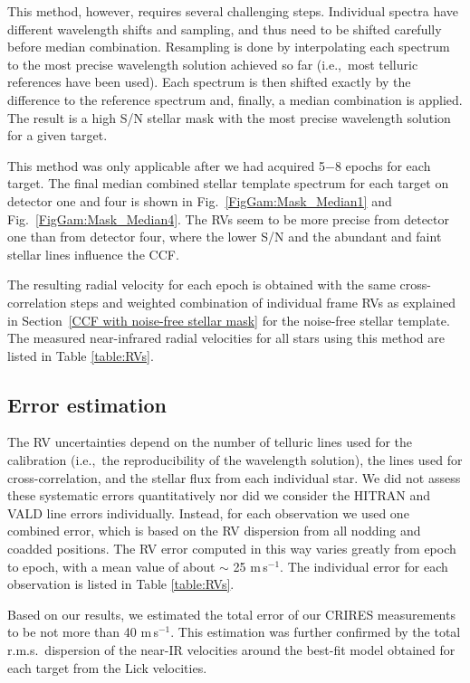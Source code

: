 \documentclass{aa}
\begin{document}
This method, however, requires several challenging steps. 
Individual spectra have different wavelength shifts and sampling, and thus need to be shifted carefully
before median combination.
Resampling is done by interpolating each spectrum to the most precise wavelength solution
achieved so far (i.e.,\ most telluric references have been used). 
Each spectrum is then shifted exactly by the difference to the reference spectrum and, finally, a median combination is applied.
The result is a high S/N stellar mask with the most precise wavelength solution for a given target.

This method was only applicable after we had acquired 5$-$8 epochs for each target. 
The final median combined stellar template spectrum for each target 
on detector one and four is shown in Fig.~\ref{FigGam:Mask_Median1} and Fig.~\ref{FigGam:Mask_Median4}.
The RVs seem to be more precise from detector one than from detector four,
where the lower S/N and the abundant and faint stellar lines influence the CCF.


The resulting radial velocity for each epoch is obtained with the same cross-correlation steps and weighted
combination of individual frame RVs as explained in Section~\ref{CCF with noise-free stellar mask}
for the noise-free stellar template. 
The measured near-infrared radial velocities for all stars using this method are listed in Table \ref{table:RVs}.



\subsection{Error estimation}
\label{Errorestimation}
 

The RV uncertainties depend on the number of telluric lines used for the calibration 
(i.e.,\ the reproducibility of the wavelength solution), the lines used for cross-correlation,
and the stellar flux from each individual star.
We did not assess these systematic errors quantitatively nor did we consider the HITRAN and VALD line errors individually.
Instead, for each observation we used one combined error, which is based on the RV dispersion
from all nodding and coadded positions.
The RV error computed in this way varies greatly from epoch to epoch, with a mean value of about $\sim$ 25 m\,s$^{-1}$. 
The individual error for each observation is listed in Table \ref{table:RVs}.

Based on our results, we estimated the total error of our CRIRES measurements to be not more than 40 m\,s$^{-1}$.
This estimation was further confirmed by the total r.m.s.\ dispersion of the near-IR velocities around the 
best-fit model obtained for each target from the Lick velocities. 
\end{document}

